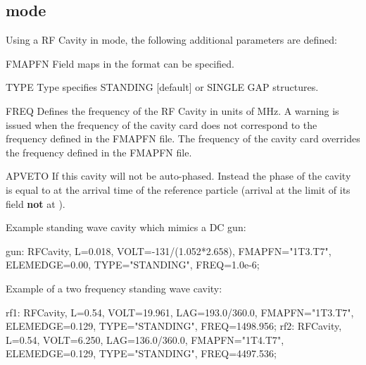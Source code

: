 \subsection{\opalt mode}
\label{sec:cavity-t}
Using a RF Cavity in \opalt mode, the following additional parameters are defined:
\begin{kdescription}
\item[FMAPFN]
  Field maps in the  format can be specified.
\item[TYPE]
  Type specifies STANDING [default] or SINGLE GAP structures.
\item[FREQ]
  Defines the frequency of the RF Cavity in units of MHz. A warning is issued when the frequency of
  the cavity card does not correspond to the frequency defined in the   FMAPFN file. The  frequency of
  the cavity card overrides the  frequency defined in the  FMAPFN file.
\item[APVETO]
  If  this cavity will not be auto-phased. Instead the phase of the cavity is equal to  at the arrival time of the reference particle (arrival at the limit of its field {\textbf{not}} at ).
  \end{kdescription}
\noindent Example standing wave cavity which mimics a DC gun:
\begin{example}
gun: RFCavity, L=0.018, VOLT=-131/(1.052*2.658),
     FMAPFN="1T3.T7", ELEMEDGE=0.00,
     TYPE="STANDING", FREQ=1.0e-6;
\end{example}
\noindent Example of a two frequency standing wave cavity:
\begin{example}
rf1: RFCavity, L=0.54, VOLT=19.961, LAG=193.0/360.0,
     FMAPFN="1T3.T7", ELEMEDGE=0.129, TYPE="STANDING",
     FREQ=1498.956;
rf2: RFCavity, L=0.54, VOLT=6.250, LAG=136.0/360.0,
     FMAPFN="1T4.T7", ELEMEDGE=0.129, TYPE="STANDING",
     FREQ=4497.536;
\end{example}


